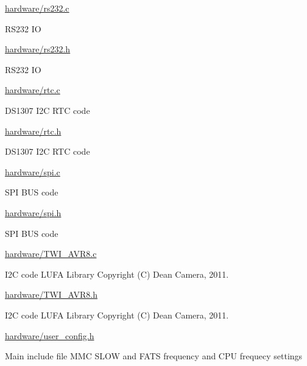 \begin{DoxyItemize}
\begin{DoxyItemize}
\item \hyperlink{rs232_8c}{hardware/rs232.\+c}
\begin{DoxyItemize}
\item R\+S232 IO
\end{DoxyItemize}
\item \hyperlink{rs232_8h}{hardware/rs232.\+h}
\begin{DoxyItemize}
\item R\+S232 IO
\end{DoxyItemize}
\item \hyperlink{rtc_8c}{hardware/rtc.\+c}
\begin{DoxyItemize}
\item D\+S1307 I2C R\+TC code
\end{DoxyItemize}
\item \hyperlink{rtc_8h}{hardware/rtc.\+h}
\begin{DoxyItemize}
\item D\+S1307 I2C R\+TC code
\end{DoxyItemize}
\item \hyperlink{spi_8c}{hardware/spi.\+c}
\begin{DoxyItemize}
\item S\+PI B\+US code
\end{DoxyItemize}
\item \hyperlink{spi_8h}{hardware/spi.\+h}
\begin{DoxyItemize}
\item S\+PI B\+US code
\end{DoxyItemize}
\item \hyperlink{TWI__AVR8_8c}{hardware/\+T\+W\+I\+\_\+\+A\+V\+R8.\+c}
\begin{DoxyItemize}
\item I2C code L\+U\+FA Library Copyright (C) Dean Camera, 2011.
\end{DoxyItemize}
\item \hyperlink{TWI__AVR8_8h}{hardware/\+T\+W\+I\+\_\+\+A\+V\+R8.\+h}
\begin{DoxyItemize}
\item I2C code L\+U\+FA Library Copyright (C) Dean Camera, 2011.
\end{DoxyItemize}
\item \hyperlink{user__config_8h}{hardware/user\+\_\+config.\+h}
\begin{DoxyItemize}
\item Main include file M\+MC S\+L\+OW and F\+A\+TS frequency and C\+PU frequecy settings
\end{DoxyItemize}

\end{DoxyItemize}
\end{DoxyItemize}
